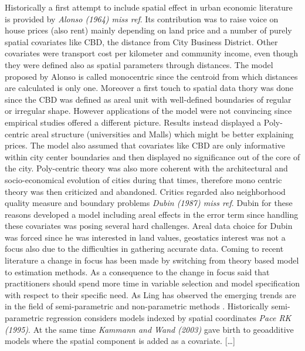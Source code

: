 \documentclass[
  12pt,
  a4paper,
  oneside]{book}
\theoremstyle{definition}
\theoremstyle{definition}
\theoremstyle{definition}
\theoremstyle{remark}
\begin{document}
Historically a first attempt to include spatial effect in urban economic literature is provided by \emph{Alonso (1964) miss ref}. Its contribution was to raise voice on house prices (also rent) mainly depending on land price and a number of purely spatial covariates like CBD, the distance from City Business District. Other covariates were transport cost per kilometer and community income, even though they were defined also as spatial parameters through distances. The model proposed by Alonso is called monocentric since the centroid from which distances are calculated is only one. Moreover a first touch to spatial data thory was done since the CBD was defined as areal unit with well-defined boundaries of regular or irregular shape. However applications of the model were not convincing since empirical studies offered a different picture. Results instead displayed a Poly-centric areal structure (universities and Malls) which might be better explaining prices. The model also assumed that covariates like CBD are only informative within city center boundaries and then displayed no significance out of the core of the city. Poly-centric theory was also more coherent with the architectural and socio-economical evolution of cities during that times, therefore mono centric theory was then criticized and abandoned. Critics regarded also neighborhood quality measure and boundary problems \emph{Dubin (1987) miss ref}. Dubin for these reasons developed a model including areal effects in the error term since handling these covariates was posing several hard challenges. Areal data choice for Dubin was forced since he was interested in land values, geostatics interest was not a focus also due to the difficulties in gathering accurate data. Coming to recent literature a change in focus has been made by switching from theory based model to estimation methods. As a consequence to the change in focus \citet{Ling} said that practitioners should spend more time in variable selection and model specification with respect to their specific need.
As Ling has observed the emerging trends are in the field of semi-parametric and non-parametric methods \citeyearpar{Ling}. Historically semi-parametric regression considers models indexed by spatial coordinates \emph{Pace RK (1995)}. At the same time \emph{Kammann and Wand (2003)} gave birth to geoadditive models where the spatial component is added as a covariate. {[}\ldots{]}
\end{document}
